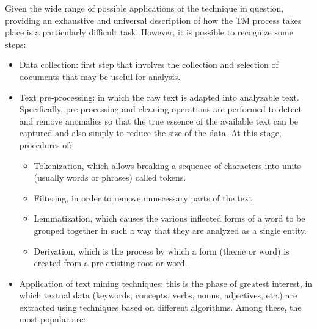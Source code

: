 \documentclass[
]{book}
\providecommand{\tightlist}{%
  \setlength{\itemsep}{0pt}\setlength{\parskip}{0pt}}
\begin{document}
Given the wide range of possible applications of the technique in question, providing an exhaustive and universal description of how the TM process takes place is a particularly difficult task. However, it is possible to recognize some steps:

\begin{itemize}
\item
  Data collection: first step that involves the collection and selection of documents that may be useful for analysis.\\
\item
  Text pre-processing: in which the raw text is adapted into analyzable text. Specifically, pre-processing and cleaning operations are performed to detect and remove anomalies so that the true essence of the available text can be captured and also simply to reduce the size of the data. At this stage, procedures of:

  \begin{itemize}
  \tightlist
  \item
    Tokenization, which allows breaking a sequence of characters into units (usually words or phrases) called tokens.\\
  \item
    Filtering, in order to remove unnecessary parts of the text.\\
  \item
    Lemmatization, which causes the various inflected forms of a word to be grouped together in such a way that they are analyzed as a single entity.\\
  \item
    Derivation, which is the process by which a form (theme or word) is created from a pre-existing root or word.
  \end{itemize}
\item
  Application of text mining techniques: this is the phase of greatest interest, in which textual data (keywords, concepts, verbs, nouns, adjectives, etc.) are extracted using techniques based on different algorithms. Among these, the most popular are:


\end{itemize}
\end{document}
